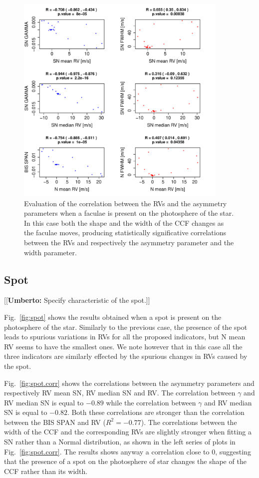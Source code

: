 \documentclass[11pt, oneside]{article}
\newcommand{\umberto}[1]{{\color{green}[[\textbf{Umberto: }#1]]}}
\begin{document}
\begin{figure}[htbp]
   \centering
\includegraphics[height = 4in]{SOAP_FACULAE_Comparison_para_SN.pdf} 
   \caption{Evaluation of the correlation between the RVs and the asymmetry parameters when a faculae is present on the photosphere of the star. In this case both the shape and the width of the CCF changes as the faculae moves, producing statistically significative correlations between the RVs and respectively the asymmetry parameter and the width parameter.}
    \label{fig:faculae.corr}
\end{figure}

\subsection{Spot} \label{sec:soap.spot}

\umberto{Specify characteristic of the spot.}

Fig.~\ref{fig:spot} shows the results obtained when a spot is present on the photosphere of the star. Similarly to the previous case, the presence of the spot leads to spurious variations in RVs for all the proposed indicators, but N mean RV seems to have the smallest ones. We note however that in this case all the three indicators are similarly effected by the spurious changes in RVs caused by the spot. %

Fig.~\ref{fig:spot.corr} shows the correlations between the asymmetry parameters and respectively RV mean SN, RV median SN and RV. The correlation between $\gamma$ and RV median SN is equal to $-0.89$ while the correlation between $\gamma$ and RV median SN is equal to $-0.82$. Both these correlations are stronger than the correlation between the BIS SPAN and RV ($R^2=-0.77$). The correlations between the width of the CCF and the corresponding RVs are slightly stronger when fitting a SN rather than a Normal distribution, as shown in the left series of plots in Fig.~\ref{fig:spot.corr}. The results shows anyway a correlation close to $0$, suggesting that the presence of a spot on the photosphere of star changes the shape of the CCF rather than its width.
\end{document}
